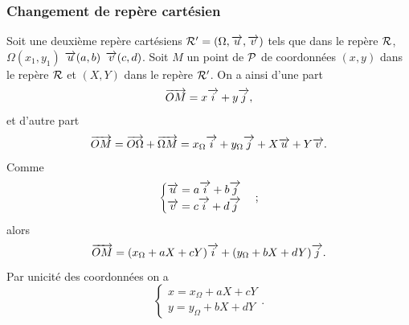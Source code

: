 \subsubsection{Changement de repère cartésien}
\label{subsubsec:changementsdereperecart}
Soit une deuxième repère cartésiens \(\Rep'=(\Omega,\vu,\vv)\) tels que dans le repère \(\Rep\), \(\Omega(x_1,y_1)\) \(\vu(a,b)\) \(\vv(c,d)\). Soit \(M\) un point de \(\P\) de coordonnées \((x,y)\) dans le repère \(\Rep\) et \((X,Y)\) dans le repère \(\Rep'\).
On a ainsi d'une part
\begin{equation}
 \vect{OM}=x \vi+ y \vj, 
\end{equation}
et d'autre part
\begin{equation}
  \vect{OM}=\vect{O\Omega}+\vect{\Omega M}=x_\Omega \vi + y_\Omega \vj + X \vu +Y\vv.
\end{equation}
Comme
\begin{equation}
  \begin{cases}
    \vu=a \vi + b \vj \\
    \vv=c\vi+d\vj
  \end{cases};
\end{equation}
alors
\begin{equation}
 \vect{OM}=(x_\Omega+aX+cY)\vi+(y_\Omega+bX+dY) \vj. 
\end{equation}
Par unicité des coordonnées on a
\begin{equation}
  \begin{cases}
    x=x_\Omega+aX+cY\\
    y=y_\Omega+bX+dY
  \end{cases}.
\end{equation}
%

